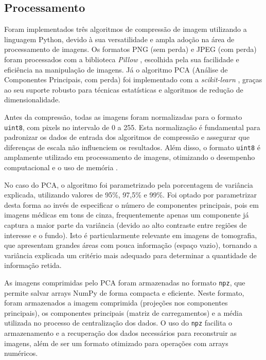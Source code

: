 \subsection{Processamento}

Foram implementados três algoritmos de compressão de imagem utilizando a linguagem Python, devido à sua versatilidade e ampla adoção na área de processamento de imagens. Os formatos \acrshort{PNG} (sem perda) e \acrshort{JPEG} (com perda) foram processados com a biblioteca \textit{Pillow} \cite{pillowDocumentation}, escolhida pela sua facilidade e eficiência na manipulação de imagens. Já o algoritmo \acrshort{PCA} (Análise de Componentes Principais, com perda) foi implementado com a \textit{scikit-learn} \cite{sklearnDocumentation}, graças ao seu suporte robusto para técnicas estatísticas e algoritmos de redução de dimensionalidade.

Antes da compressão, todas as imagens foram normalizadas para o formato \texttt{uint8}, com pixels no intervalo de 0 a 255. Esta normalização é fundamental para padronizar os dados de entrada dos algoritmos de compressão e assegurar que diferenças de escala não influenciem os resultados. Além disso, o formato \texttt{uint8} é amplamente utilizado em processamento de imagens, otimizando o desempenho computacional e o uso de memória \cite{digitalImageProcessingGonzalez}.

No caso do \acrshort{PCA}, o algoritmo foi parametrizado pela porcentagem de variância explicada, utilizando valores de 95\%, 97,5\% e 99\%. Foi optado por parametrizar desta forma ao invés de especificar o número de componentes principais, pois em imagens médicas em tons de cinza, frequentemente apenas um componente já captura a maior parte da variância (devido ao alto contraste entre regiões de interesse e o fundo). Isto é particularmente relevante em imagens de tomografia, que apresentam grandes áreas com pouca informação (espaço vazio), tornando a variância explicada um critério mais adequado para determinar a quantidade de informação retida.

As imagens comprimidas pelo \acrshort{PCA} foram armazenadas no formato \texttt{npz}, que permite salvar arrays NumPy \cite{numpyDocumentation} de forma compacta e eficiente. Neste formato, foram armazenados a imagem comprimida (projeções nos componentes principais), os componentes principais (matriz de carregamentos) e a média utilizada no processo de centralização dos dados. O uso do \texttt{npz} facilita o armazenamento e a recuperação dos dados necessários para reconstruir as imagens, além de ser um formato otimizado para operações com arrays numéricos.

